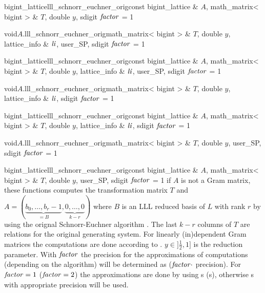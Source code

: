 \begin{fcode}{bigint_lattice}{lll_schnorr_euchner_orig}{const bigint_lattice & $A$,
    math_matrix< bigint > & $T$, double $y$, sdigit $\mathit{factor}$ = 1}%
\end{fcode}

\begin{fcode}{void}{$A$.lll_schnorr_euchner_orig}{math_matrix< bigint > & $T$, double $y$,
    lattice_info & $\mathit{li}$, user_SP, sdigit $\mathit{factor}$ = 1}%
\end{fcode}

\begin{fcode}{bigint_lattice}{lll_schnorr_euchner_orig}{const bigint_lattice & $A$,
    math_matrix< bigint > & $T$, double $y$, lattice_info & $\mathit{li}$, user_SP, sdigit $\mathit{factor}$ = 1}%
\end{fcode}

\begin{fcode}{void}{$A$.lll_schnorr_euchner_orig}{math_matrix< bigint > & $T$, double $y$,
    lattice_info & $\mathit{li}$, sdigit $\mathit{factor}$ = 1}%
\end{fcode}

\begin{fcode}{bigint_lattice}{lll_schnorr_euchner_orig}{const bigint_lattice & $A$,
    math_matrix< bigint > & $T$, double $y$, lattice_info & $\mathit{li}$, sdigit $\mathit{factor}$ = 1}%
\end{fcode}

\begin{fcode}{void}{$A$.lll_schnorr_euchner_orig}{math_matrix< bigint > & $T$, double $y$,
    user_SP, sdigit $\mathit{factor}$ = 1}%
\end{fcode}

\begin{fcode}{bigint_lattice}{lll_schnorr_euchner_orig}{const bigint_lattice & $A$,
    math_matrix< bigint > & $T$, double $y$, user_SP, sdigit $\mathit{factor}$ = 1}%
  if $A$ is not a Gram matrix, these functions computes the transformation matrix $T$ and $A =
  (\underbrace{b_0, \dots, b_r-1}_{=B}, \underbrace{0, \dots, 0}_{k-r})$ where $B$ is an LLL
  reduced basis of $L$ with rank $r$ by using the orignal Schnorr-Euchner algorithm
  \cite{Schnorr/Euchner:1994}.  The last $k-r$ columns of $T$ are relations for the original
  generating system.  For linearly (in)dependent Gram matrices the computations are done
  according to \cite{Cohen:1995}.  $y\in ]\frac{1}{2},1]$ is the reduction parameter.  With
  $\mathit{factor}$ the precision for the approximations of computations (depending on the algorithm)
  will be determined as ($\mathit{factor} \cdot$  precision).  For $\mathit{factor} = 1$ ($\mathit{factor}
  = 2$) the approximations are done by using s (s), otherwise
  s with appropriate precision will be used.
\end{fcode}


